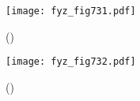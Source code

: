     \begin{figure}[ht!] %
      \centering
      \texttt{[image: fyz\_fig731.pdf]}
      \caption{
               (\cite[s.~707]{Feynman02})}
      \label{fyz_fig731}
    \end{figure}

    \begin{figure}[ht!] %
      \centering
      \texttt{[image: fyz\_fig732.pdf]}
      \caption{
               (\cite[s.~707]{Feynman02})}
      \label{fyz_fig732}
    \end{figure}


\printbibliography[title={Seznam literatury},heading=subbibliography]
